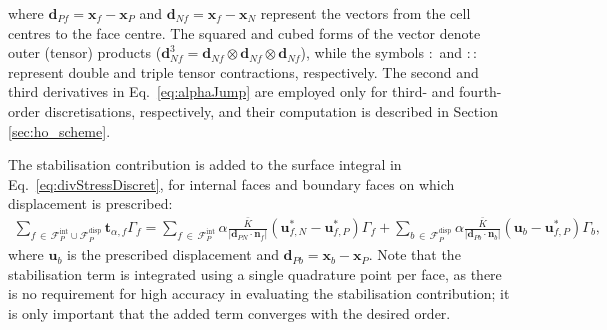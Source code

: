\documentclass[review,3p]{elsarticle}
\newcommand{\bb}{\boldsymbol}
\begin{document}
where $\bb{d}_{Pf} = \bb{x}_f - \bb{x}_P$ and $\bb{d}_{Nf} = \bb{x}_f - \bb{x}_N$ represent the vectors from the cell centres to the face centre.
The squared and cubed forms of the vector denote outer (tensor) products ($\bb{d}_{Nf}^3=\bb{d}_{Nf}\otimes \bb{d}_{Nf} \otimes  \bb{d}_{Nf}$), while the symbols $:$ and $\!::\!$ represent double and triple tensor contractions, respectively.
The second and third derivatives in Eq.~\eqref{eq:alphaJump} are employed only for third- and fourth-order discretisations, respectively, and their computation is described in Section \ref{sec:ho_scheme}.

The stabilisation contribution is added to the surface integral in Eq.~\eqref{eq:divStressDiscret}, for internal faces and boundary faces on which displacement is prescribed:
\begin{eqnarray}
	\sum_{f \,\in\, \mathcal{F}_P^{\text{int}} \cup \mathcal{F}_P^{\text{disp}}} \bb{t}_{\alpha, f} \Gamma_f =
	\sum_{f \,\in\, \mathcal{F}_P^{\text{int}}}  \alpha \frac{\bar{K}}{|\bb{d}_{PN} \cdot \bb{n}_f|}(\bb{u}_{f,N}^*-\bb{u}_{f,P}^*)\Gamma_f
	+
	\sum_{b \,\in\, \mathcal{F}_P^{\text{disp}}}  \alpha \frac{\bar{K}}{|\bb{d}_{Pb} \cdot \bb{n}_b|}(\bb{u}_{b}-\bb{u}_{f,P}^*)\Gamma_b,
\end{eqnarray}
where $\bb{u}_{b}$ is the prescribed displacement and $\bb{d}_{Pb}=\bb{x}_b - \bb{x}_P$. Note that the stabilisation term is integrated using a single quadrature point per face, as there is no requirement for high accuracy in evaluating the stabilisation contribution; it is only important that the added term converges with the desired order.
%
\end{document}
